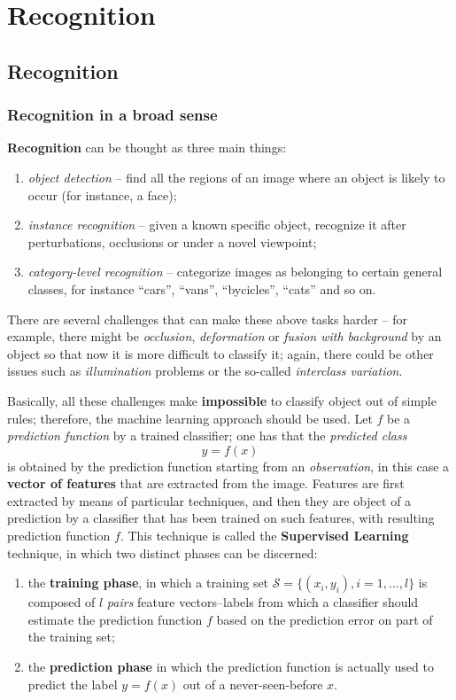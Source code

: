 \documentclass[10pt]{report}
\begin{document}
\chapter{Recognition}
\label{sec:orgff195ef}
\section{Recognition}
\label{sec:orga7498b5}
\subsection{Recognition in a broad sense}
\label{sec:org0b6a4b6}
\textbf{Recognition} can be thought as three main things:
\begin{enumerate}
\item \emph{object detection} -- find all the regions of an image where an object is likely to occur (for instance, a face);
\item \emph{instance recognition} -- given a known specific object, recognize it after perturbations, occlusions or under a novel viewpoint;
\item \emph{category\--level recognition} -- categorize images as belonging to certain general classes, for instance ``cars'', ``vans'', ``bycicles'', ``cats'' and so on.
\end{enumerate}

There are several challenges that can make these above tasks harder -- for example, there might be \emph{occlusion}, \emph{deformation} or \emph{fusion with background} by an object so that now it is more difficult to classify it; again, there could be other issues such as \emph{illumination} problems or the so\--called \emph{interclass variation}.

Basically, all these challenges make \textbf{impossible} to classify object out of simple rules; therefore, the machine learning approach should be used. Let \(f\) be a \emph{prediction function} by a trained classifier; one has that the \emph{predicted class} $$y = f(x)$$ is obtained by the prediction function starting from an \emph{observation}, in this case a \textbf{vector of features} that are extracted from the image. Features are first extracted by means of particular techniques, and then they are object of a prediction by a classifier that has been trained on such features, with resulting prediction function \(f\). This technique is called the \textbf{Supervised Learning} technique, in which two distinct phases can be discerned:
\begin{enumerate}
\item the \textbf{training phase}, in which a training set \(\mathcal S = \{(x_i, y_i), i = 1,\dots,l\}\) is composed of \(l\) \emph{pairs} feature vectors\---labels from which a classifier should estimate the prediction function \(f\) based on the prediction error on part of the training set;
\item the \textbf{prediction phase} in which the prediction function is actually used to predict the label \(y = f(x)\) out of a never\--seen\--before \(x\).
\end{enumerate}
\end{document}
